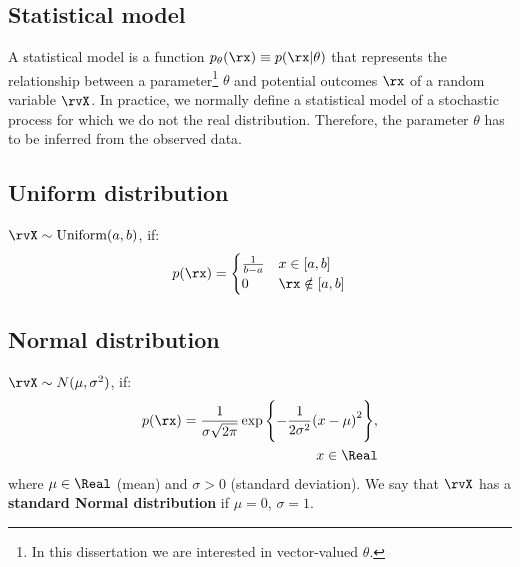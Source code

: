 \subsection{Statistical model}\label{sec:statistical_model}
A statistical model is a function $p_{\theta}(\rx) \equiv p(\rx | \theta)$ that represents the relationship between a parameter\footnote{In this dissertation we are interested in vector-valued $\theta$.} $\theta$ and potential outcomes $\rx$ of a random variable $\rvX$. In practice, we normally define a statistical model of a stochastic process for which we do not the real distribution. Therefore, the parameter $\theta$ has to be inferred from the observed data.
\subsection{Uniform distribution}\label{sec:uniform_distribution}
\(\nonumber \\\rvX \sim \text{Uniform}(a,b)\), if:\\
\begin{align*}
	p(\rx)=
	\begin{cases}
		\frac{1}{b-a} & x \in [a,b]\\
		0 & \rx \notin [a,b]
	\end{cases}
\end{align*}
\subsection{Normal distribution}
\(\nonumber \\\rvX \sim N(\mu, \sigma^2)\), if:
\begin{align*}
	p(\rx)=\frac{1}{\sigma \sqrt{2\pi}}\exp{\Biggl{\{}{-\frac{1}{2\sigma^2}{(x-\mu)}^2}\Biggr{\}}}, \\~x \in \Real \\
\end{align*}
where \(\mu \in \Real\) (mean) and \(\sigma > 0\) (standard deviation). We say that \(\rvX\) has a \textbf{standard Normal distribution} if \(\mu = 0\), \( \sigma =1\).
